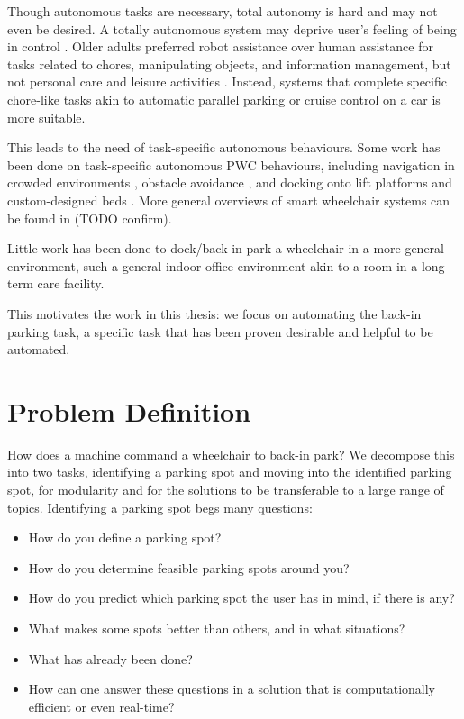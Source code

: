 Though autonomous tasks are necessary, total autonomy is hard and may not even be desired. 
A totally autonomous system may deprive user's feeling of being in control 
\cite{viswanathana2014wizard}.
Older adults preferred robot assistance over human assistance for tasks related
to chores, manipulating objects, and information management, but not personal
care and leisure activities \cite{smarr2014domestic}.
Instead, systems that complete specific chore-like tasks akin to automatic
parallel parking or cruise control on a car is more suitable.

This leads to the need of task-specific autonomous behaviours.
Some work has been done on task-specific autonomous PWC behaviours, including
navigation in crowded environments \cite{prassler2001robotics}, obstacle
avoidance \cite{viswanathan2012navigation}, and docking onto lift platforms
\cite{sermeno2006vision} and custom-designed beds \cite{ren2012docking}.
More general overviews of smart wheelchair systems can be found in
\cite{viswanathan2012navigation, simpson2005smart, faria2013patient} (TODO
confirm).

Little work has been done to dock/back-in park a wheelchair in a more general
environment, such a general indoor office environment akin to a room in a
long-term care facility. 

This motivates the work in this thesis: we focus on automating the back-in
parking task, a specific task that has been proven desirable and helpful to be
automated.

\section{Problem Definition}
How does a machine command a wheelchair to back-in park? We decompose this into two
tasks, identifying a parking spot and moving into the identified parking spot,
for modularity and for the solutions to be transferable to a large range of
topics.
Identifying a parking spot begs many questions:
\begin{itemize}
\item How do you define a parking spot?
\item How do you determine feasible parking spots around you?
\item How do you predict which parking spot the user has in mind, if there is any?
\item What makes some spots better than others, and in what situations?
\item What has already been done?
\item How can one answer these questions in a solution that is 
computationally efficient or even real-time?
\end{itemize}



